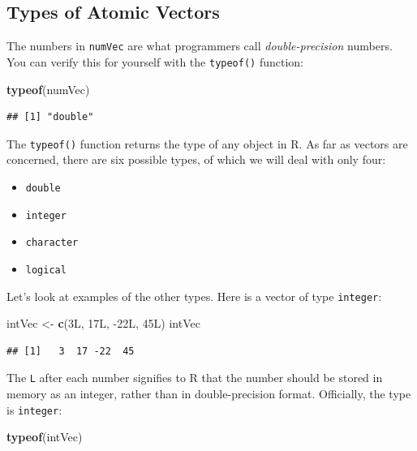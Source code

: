\documentclass[]{book}
\makeatletter
\newenvironment{Shaded}{\begin{snugshade}}{\end{snugshade}}
\newcommand{\KeywordTok}[1]{\textcolor[rgb]{0.13,0.29,0.53}{\textbf{{#1}}}}
\newcommand{\StringTok}[1]{\textcolor[rgb]{0.31,0.60,0.02}{{#1}}}
\newcommand{\NormalTok}[1]{{#1}}
\providecommand{\tightlist}{%
  \setlength{\itemsep}{0pt}\setlength{\parskip}{0pt}}
\newenvironment{kframe}{%
\medskip{}
\setlength{\fboxsep}{.8em}
 \def\at@end@of@kframe{}%
 \ifinner\ifhmode%
  \def\at@end@of@kframe{\end{minipage}}%
  \begin{minipage}{\columnwidth}%
 \fi\fi%
 \def\FrameCommand##1{\hskip\@totalleftmargin \hskip-\fboxsep
 \colorbox{shadecolor}{##1}\hskip-\fboxsep
     \hskip-\linewidth \hskip-\@totalleftmargin \hskip\columnwidth}%
 \MakeFramed {\advance\hsize-\width
   \@totalleftmargin\z@ \linewidth\hsize
   \@setminipage}}%
 {\par\unskip\endMakeFramed%
 \at@end@of@kframe}
\renewenvironment{Shaded}{\begin{kframe}}{\end{kframe}}
\theoremstyle{definition}
\theoremstyle{definition}
\theoremstyle{remark}
\makeatother
\begin{document}
\subsection{Types of Atomic Vectors}\label{types-of-atomic-vectors}

The numbers in \texttt{numVec} are what programmers call
\emph{double-precision} numbers. You can verify this for yourself with
the \texttt{typeof()}
function:

\begin{Shaded}
\begin{Highlighting}[]
\KeywordTok{typeof}\NormalTok{(numVec)}
\end{Highlighting}
\end{Shaded}

\begin{verbatim}
## [1] "double"
\end{verbatim}

The \texttt{typeof()} function returns the type of any object in R. As
far as vectors are concerned, there are six possible types, of which we
will deal with only four:

\begin{itemize}
\tightlist
\item
  \texttt{double}
\item
  \texttt{integer}
\item
  \texttt{character}
\item
  \texttt{logical}
\end{itemize}

Let's look at examples of the other types. Here is a vector of type
\texttt{integer}:

\begin{Shaded}
\begin{Highlighting}[]
\NormalTok{intVec <-}\StringTok{ }\KeywordTok{c}\NormalTok{(3L, 17L, -22L, 45L)}
\NormalTok{intVec}
\end{Highlighting}
\end{Shaded}

\begin{verbatim}
## [1]   3  17 -22  45
\end{verbatim}

The \texttt{L} after each number signifies to R that the number should
be stored in memory as an integer, rather than in double-precision
format. Officially, the type is \texttt{integer}:

\begin{Shaded}
\begin{Highlighting}[]
\KeywordTok{typeof}\NormalTok{(intVec)}
\end{Highlighting}
\end{Shaded}
\end{document}
